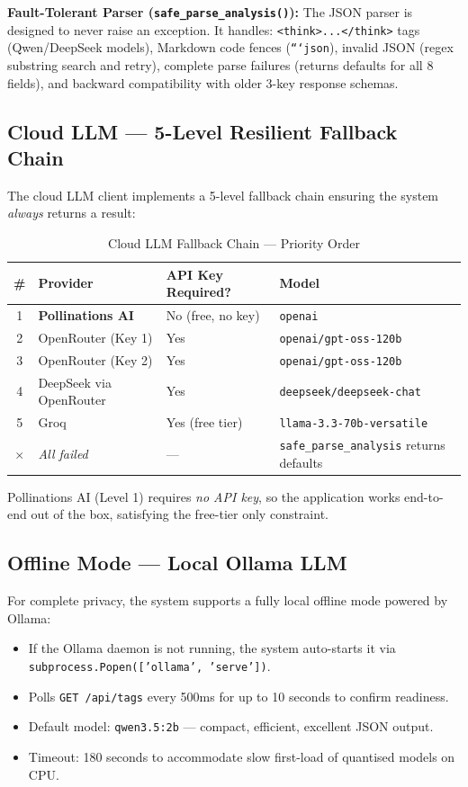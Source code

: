 \documentclass[12pt,a4paper]{article}
\begin{document}
\textbf{Fault-Tolerant Parser (\texttt{safe\_parse\_analysis()}):} The JSON
parser is designed to never raise an exception. It handles:
\texttt{<think>...</think>} tags (Qwen/DeepSeek models), Markdown code fences
(\texttt{```json}), invalid JSON (regex substring search and retry), complete parse
failures (returns defaults for all 8 fields), and backward compatibility with
older 3-key response schemas.

\subsection{Cloud LLM --- 5-Level Resilient Fallback Chain}

The cloud LLM client implements a 5-level fallback chain ensuring the system
\emph{always} returns a result:

\begin{table}[h]
\centering
\begin{tabular}{@{}clll@{}}
\toprule
\textbf{\#} & \textbf{Provider} & \textbf{API Key Required?} & \textbf{Model} \\
\midrule
1 & \textbf{Pollinations AI} & No (free, no key) & \texttt{openai} \\
2 & OpenRouter (Key 1) & Yes & \texttt{openai/gpt-oss-120b} \\
3 & OpenRouter (Key 2) & Yes & \texttt{openai/gpt-oss-120b} \\
4 & DeepSeek via OpenRouter & Yes & \texttt{deepseek/deepseek-chat} \\
5 & Groq & Yes (free tier) & \texttt{llama-3.3-70b-versatile} \\
\midrule
$\times$ & \textit{All failed} & --- & \texttt{safe\_parse\_analysis} returns defaults \\
\bottomrule
\end{tabular}
\caption{Cloud LLM Fallback Chain --- Priority Order}
\end{table}

Pollinations AI (Level 1) requires \emph{no API key}, so the application works
end-to-end out of the box, satisfying the free-tier only constraint.

\subsection{Offline Mode --- Local Ollama LLM}

For complete privacy, the system supports a fully local offline mode powered by
Ollama:

\begin{itemize}[leftmargin=1.5cm]
    \item If the Ollama daemon is not running, the system auto-starts it via
    \texttt{subprocess.Popen(['ollama', 'serve'])}.
    \item Polls \texttt{GET /api/tags} every 500ms for up to 10 seconds to confirm
    readiness.
    \item Default model: \texttt{qwen3.5:2b} --- compact, efficient, excellent JSON output.
    \item Timeout: 180 seconds to accommodate slow first-load of quantised models on CPU.
\end{itemize}
\end{document}
